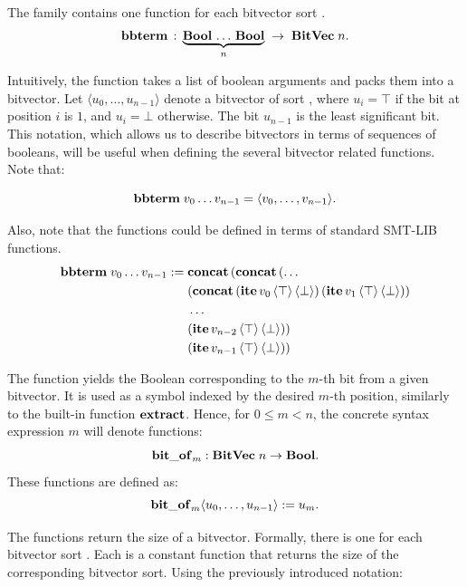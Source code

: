 \documentclass{scrartcl}
\begin{document}
The family \bbterm{} contains one function for each bitvector sort .
\[
\mathbf{bbterm} \, : \,\underbrace{\mathbf{Bool}\, \dots\, \mathbf{Bool}}_n \; \to \; \mathbf{BitVec} \; n.
\]

\noindent
Intuitively, the function \bbterm{} takes a list of boolean arguments and packs 
them into a bitvector.
Let $\langle u_0, \dots, u_{n - 1}\rangle$ denote a bitvector of sort , 
where $u_i = \top$ if the bit at position $i$ is $1$, and $u_i = \bot$ otherwise. 
The bit $u_{n - 1}$ is the least significant bit. This notation, which allows us to 
describe bitvectors in terms of sequences of booleans, will 
be useful when defining the several bitvector related functions. Note that:

\[
\mathbf{bbterm}\; v_0 \dots v_{n - 1} = \langle v_0, \dots, v_{n - 1}\rangle .
\]

\noindent
Also, note that the \bbterm{} functions could be defined in terms of standard 
SMT-LIB functions.
\begin{align*}
\mathbf{bbterm}\;v_0 \dots v_{n - 1} :=\;
 &\mathbf{concat}\,(\mathbf{concat}\,(\dots \\
 &(\mathbf{concat}\,(\mathbf{ite}\,v_0\,\langle\top\rangle\,\langle\bot\rangle)\,
                                    (\mathbf{ite}\,v_1\,\langle\top\rangle\,\langle\bot\rangle))\\
 & \dots \\
 & (\mathbf{ite}\,v_{n - 2}\,\langle\top\rangle\,\langle\bot\rangle)) \\
 & (\mathbf{ite}\,v_{n - 1}\,\langle\top\rangle\,\langle\bot\rangle)) \\
\end{align*}

\noindent
The function  yields the Boolean corresponding to the $m$-th
bit from a given bitvector. It is used as a symbol indexed by the desired $m$-th 
position, similarly to the built-in function $\mathbf{extract}$. Hence, for 
$0 \leq m < n$, the concrete syntax expression 
\inlineAlethe{(_ } \cbitof{} $m$\inlineAlethe{)} will denote functions:
\[
\mathbf{bit\_of}_{m}: \mathbf{BitVec} \; n \to \mathbf{Bool}.
\]
These functions are defined as:
\[
\mathbf{bit\_of}_{m} \langle u_0, \dots, u_{n - 1} \rangle := u_m.
\]


\noindent
The functions \bvsize{} return the size of a bitvector. Formally, there is one 
\bvsize{} for each bitvector sort .  Each \bvsize{}is a constant 
function that returns the size of the corresponding bitvector sort. Using the 
previously introduced notation:
\end{document}

